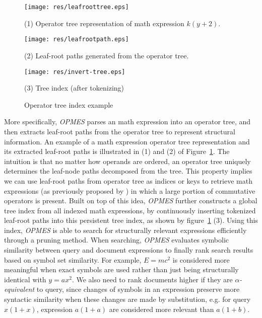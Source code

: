 \documentclass{llncs}
\begin{document}
\begin{figure}

\begin{minipage}[b]{1.2in}
\begin{center}
\texttt{[image: res/leafroottree.eps]}
\end{center}
(1) Operator tree representation of math expression $k(y + 2)$.
\end{minipage}
\hspace*{0.3in}
\begin{minipage}[b]{1.2in}
\begin{center}
\texttt{[image: res/leafrootpath.eps]}
\end{center}
(2) Leaf-root paths generated from the operator tree.
\end{minipage}
\hspace*{0.3in}
\begin{minipage}[b]{1.4in}
\begin{center}
\texttt{[image: res/invert-tree.eps]}
\end{center}
(3) Tree index (after tokenizing)
\end{minipage}

\caption{Operator tree index example}\label{oprtreeExample}
\end{figure}
More specifically, 
{\em OPMES} parses an math expression into an operator tree, and then 
extracts leaf-root paths from the operator tree to represent structural information.
An example of a math expression operator tree representation and its extracted leaf-root paths 
is illustrated in (1) and (2) of Figure~\ref{oprtreeExample}.
The intuition is that no matter how operands are ordered, an operator tree uniquely determines 
the leaf-node paths decomposed from the tree. 
This property implies we can use leaf-root paths from operator tree as indices or keys to retrieve math expressions (as previously proposed by \cite{signifjap,MathMLleafroot,signfused}) in which a large portion of commutative operators is present.
Built on top of this idea, {\em OPMES} further constructs a global tree index from all indexed math expressions,
by continuously inserting tokenized leaf-root paths into this persistent tree index, as shown by figure~\ref{oprtreeExample} (3).
Using this index, {\em OPMES} is able to search for structurally relevant expressions efficiently 
through a pruning method. 
When searching, {\em OPMES} evaluates symbolic similarity between query and document expressions to finally rank search results based on symbol set similarity. 
For example, $E=mc^2$ is considered more meaningful when exact symbols are used rather than just being structurally identical with $y=ax^2$.
We also need to rank documents higher if they are \textit{$\alpha$-equivalent} to query,
since changes of symbols in an expression preserve more syntactic similarity when these changes are made by substitution, e.g. for query $x(1+x)$, expression $a(1+a)$ are considered more relevant than $a(1+b)$. 
\end{document}
